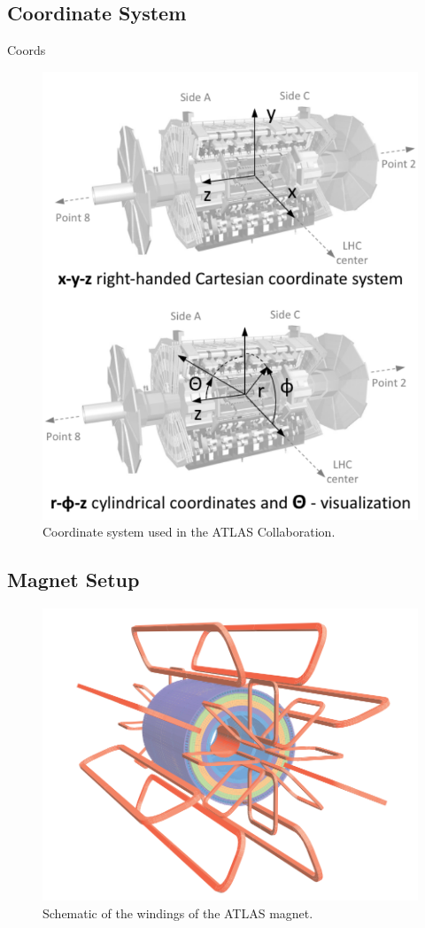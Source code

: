 \subsection{Coordinate System}
Coords
\begin{figure}[h!]
	\centering
	\includegraphics[width=0.5\columnwidth]{../ThesisImages/LHCImages/ATLASCoords.png}
	\caption[Coordinate system used in the ATLAS Collaboration.]{Coordinate system used in the ATLAS Collaboration.\cite{ATLASCoords}
	}
	\label{fig:ATLASCoords}
\end{figure}



\subsection{Magnet Setup}
\begin{figure}[h!]
	\centering
	\includegraphics[width=0.5\columnwidth]{../ThesisImages/LHCImages/ATLASMagnetWinding.png}
	\caption[Schematic of the windings of the ATLAS magnet.]{Schematic of the windings of the ATLAS magnet.\cite{ATLAS}
	}
	\label{fig:ATLASMagnetWinding}
\end{figure}

